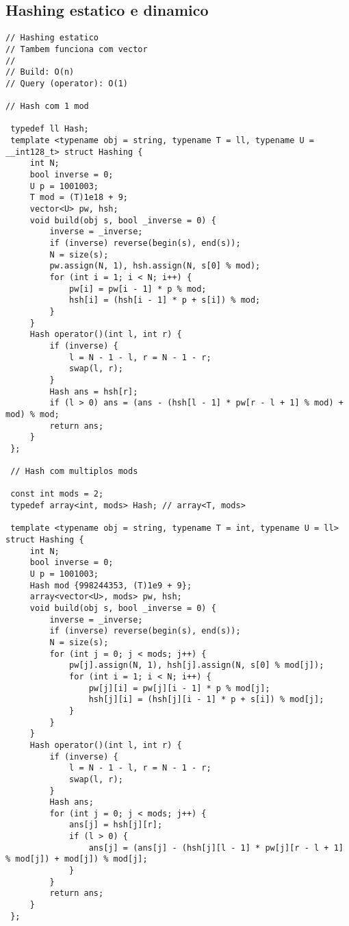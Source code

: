 \documentclass[11pt, a4paper, twoside]{article}
\begin{document}
\subsection{Hashing estatico e dinamico}
\begin{lstlisting}
// Hashing estatico
// Tambem funciona com vector
//
// Build: O(n)
// Query (operator): O(1)

// Hash com 1 mod

 typedef ll Hash;
 template <typename obj = string, typename T = ll, typename U = __int128_t> struct Hashing {
     int N;
     bool inverse = 0;
     U p = 1001003;
     T mod = (T)1e18 + 9;
     vector<U> pw, hsh;
     void build(obj s, bool _inverse = 0) {
         inverse = _inverse;
         if (inverse) reverse(begin(s), end(s));
         N = size(s);
         pw.assign(N, 1), hsh.assign(N, s[0] % mod);
         for (int i = 1; i < N; i++) {
             pw[i] = pw[i - 1] * p % mod;
             hsh[i] = (hsh[i - 1] * p + s[i]) % mod;
         }
     }
     Hash operator()(int l, int r) {
         if (inverse) {
             l = N - 1 - l, r = N - 1 - r;
             swap(l, r);
         }
         Hash ans = hsh[r];
         if (l > 0) ans = (ans - (hsh[l - 1] * pw[r - l + 1] % mod) + mod) % mod;
         return ans;
     }
 };
 
 // Hash com multiplos mods
 
 const int mods = 2;
 typedef array<int, mods> Hash; // array<T, mods>
 
 template <typename obj = string, typename T = int, typename U = ll> struct Hashing {
     int N;
     bool inverse = 0;
     U p = 1001003;
     Hash mod {998244353, (T)1e9 + 9};
     array<vector<U>, mods> pw, hsh;
     void build(obj s, bool _inverse = 0) {
         inverse = _inverse;
         if (inverse) reverse(begin(s), end(s));
         N = size(s);
         for (int j = 0; j < mods; j++) {
             pw[j].assign(N, 1), hsh[j].assign(N, s[0] % mod[j]);
             for (int i = 1; i < N; i++) {
                 pw[j][i] = pw[j][i - 1] * p % mod[j];
                 hsh[j][i] = (hsh[j][i - 1] * p + s[i]) % mod[j];
             }
         }
     }
     Hash operator()(int l, int r) {
         if (inverse) {
             l = N - 1 - l, r = N - 1 - r;
             swap(l, r);
         }
         Hash ans;
         for (int j = 0; j < mods; j++) {
             ans[j] = hsh[j][r];
             if (l > 0) {
                 ans[j] = (ans[j] - (hsh[j][l - 1] * pw[j][r - l + 1] % mod[j]) + mod[j]) % mod[j];
             }
         }
         return ans;
     }
 };
 

\end{lstlisting}
\end{document}
